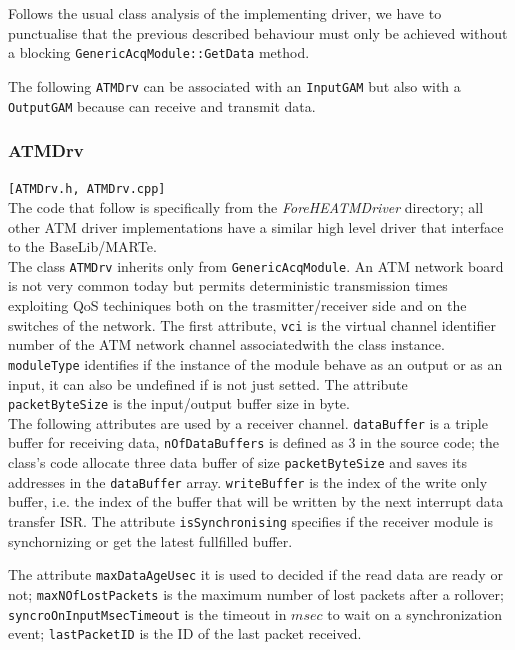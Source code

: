 Follows the usual class analysis of the implementing driver, we have to punctualise that the previous described behaviour must only be achieved without a blocking \texttt{GenericAcqModule::GetData} method.

The following \texttt{ATMDrv} can be associated with an \texttt{InputGAM} but also with a \texttt{OutputGAM} because can receive and transmit data.



\subsubsection{ATMDrv}
\texttt{[ATMDrv.h, ATMDrv.cpp]}\\
The code that follow is specifically from the \textit{ForeHEATMDriver} directory; all other ATM driver implementations have a similar high level driver that interface to the BaseLib/MARTe. \\


The class \texttt{ATMDrv} inherits only from \texttt{GenericAcqModule}. An ATM network board is not very common today but permits deterministic transmission times exploiting QoS techiniques both on the trasmitter/receiver side and on the switches of the network. The first attribute, \texttt{vci} is the virtual channel identifier number of the ATM network channel associatedwith the class instance. \texttt{moduleType} identifies if the instance of the module behave as an output or as an input, it can also be undefined if is not just setted. The attribute \texttt{packetByteSize} is the input/output buffer size in byte. \\


The following attributes are used by a receiver channel. \texttt{dataBuffer} is a triple buffer for receiving data, \texttt{nOfDataBuffers} is defined as $3$ in the source code; the class's code allocate three data buffer of size \texttt{packetByteSize} and saves its addresses in the \texttt{dataBuffer} array. \texttt{writeBuffer} is the index of the write only buffer, i.e. the index of the buffer that will be written by the next interrupt data transfer ISR. The attribute \texttt{isSynchronising} specifies if the receiver module is synchornizing or get the latest fullfilled buffer.

The attribute \texttt{maxDataAgeUsec} it is used to decided if the read data are ready or not; \texttt{maxNOfLostPackets} is the maximum number of lost packets after a rollover; \texttt{syncroOnInputMsecTimeout} is the timeout in $msec$ to wait on a synchronization event; \texttt{lastPacketID} is the ID of the last packet received.

